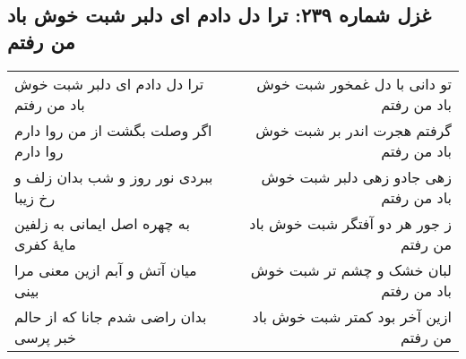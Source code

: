 \begin{center}
\section*{غزل شماره ۲۳۹: ترا دل دادم ای دلبر شبت خوش باد من رفتم}
\label{sec:239}
\begin{longtable}{l p{0.5cm} r}
ترا دل دادم ای دلبر شبت خوش باد من رفتم
&&
تو دانی با دل غمخور شبت خوش باد من رفتم
\\
اگر وصلت بگشت از من روا دارم روا دارم
&&
گرفتم هجرت اندر بر شبت خوش باد من رفتم
\\
ببردی نور روز و شب بدان زلف و رخ زیبا
&&
زهی جادو زهی دلبر شبت خوش باد من رفتم
\\
به چهره اصل ایمانی به زلفین مایهٔ کفری
&&
ز جور هر دو آفتگر شبت خوش باد من رفتم
\\
میان آتش و آبم ازین معنی مرا بینی
&&
لبان خشک و چشم تر شبت خوش باد من رفتم
\\
بدان راضی شدم جانا که از حالم خبر پرسی
&&
ازین آخر بود کمتر شبت خوش باد من رفتم
\\
\end{longtable}
\end{center}
